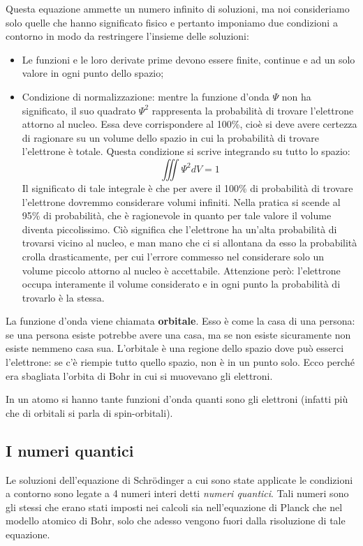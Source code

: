 Questa equazione ammette un numero infinito di soluzioni, ma noi consideriamo solo quelle che hanno significato fisico e pertanto imponiamo due condizioni a contorno in modo da restringere l'insieme delle soluzioni:
\begin{itemize}
  \item  Le funzioni e le loro derivate prime devono essere finite, continue e ad un solo valore in ogni punto dello spazio;
  \item Condizione di normalizzazione: mentre la funzione d'onda $\Psi$ non ha significato, il suo quadrato $\Psi^2$ rappresenta la probabilità di trovare l'elettrone attorno al nucleo. Essa deve corrispondere al 100\%, cioè si deve avere certezza di ragionare su un volume dello spazio in cui la probabilità di trovare l'elettrone è totale. Questa condizione si scrive integrando su tutto lo spazio:
  $$\iiint \Psi^2dV=1$$
  Il significato di tale integrale è che per avere il 100\% di probabilità di trovare l'elettrone dovremmo considerare volumi infiniti. Nella pratica si scende al 95\% di probabilità, che è ragionevole in quanto per tale valore il volume diventa piccolissimo. Ciò significa che l'elettrone ha un'alta probabilità di trovarsi vicino al nucleo, e man mano che ci si allontana da esso la probabilità crolla drasticamente, per cui l'errore commesso nel considerare solo un volume piccolo attorno al nucleo è accettabile. Attenzione però: l'elettrone occupa interamente il volume considerato e in ogni punto la probabilità di trovarlo è la stessa.
\end{itemize}
La funzione d'onda viene chiamata \textbf{orbitale}. Esso è come la casa di una persona: se una persona esiste potrebbe avere una casa, ma se non esiste sicuramente non esiste nemmeno casa sua. L'orbitale è una regione dello spazio dove può esserci l'elettrone: se c'è riempie tutto quello spazio, non è in un punto solo. Ecco perché era sbagliata l'orbita di Bohr in cui si muovevano gli elettroni. 

In un atomo si hanno tante funzioni d'onda quanti sono gli elettroni (infatti più che di orbitali si parla di spin-orbitali).
\subsection{I numeri quantici}
Le soluzioni dell'equazione di Schrödinger a cui sono state applicate le condizioni a contorno sono legate a 4 numeri interi detti \textit{numeri quantici}. Tali numeri sono gli stessi che erano stati imposti nei calcoli sia nell'equazione di Planck che nel modello atomico di Bohr, solo che adesso vengono fuori dalla risoluzione di tale equazione.

